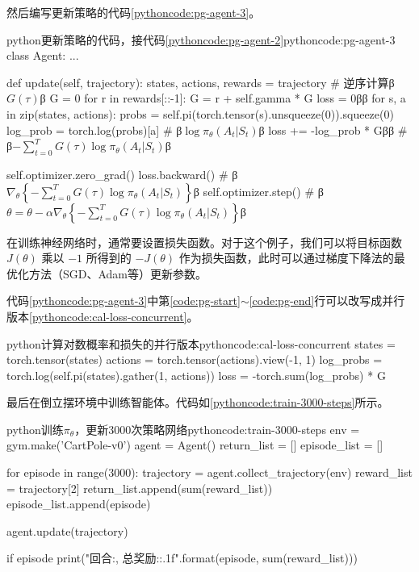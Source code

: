 \documentclass[lang=cn,newtx,10pt,scheme=chinese]{elegantbook}
\begin{document}
然后编写更新策略的代码\ref{pythoncode:pg-agent-3}。

\begin{codebox}{python}{更新策略的代码，接代码\ref{pythoncode:pg-agent-2}}{pythoncode:pg-agent-3}
class Agent:
    ...

    def update(self, trajectory):
        states, actions, rewards = trajectory
        # 逆序计算β$G(\tau)$β
        G = 0
        for r in rewards[::-1]:
            G = r + self.gamma * G
        loss = 0β$\label{code:pg-start}$β
        for s, a in zip(states, actions):
            probs = self.pi(torch.tensor(s).unsqueeze(0)).squeeze(0)
            log_prob = torch.log(probs)[a] # β$\log\pi_\theta(A_t|S_t)$β
            loss += -log_prob * Gβ$\label{code:pg-end}$β # β$-\sum_{t=0}^{T}G(\tau)\log\pi_\theta(A_t|S_t)$β

        self.optimizer.zero_grad()
        loss.backward() # β$\nabla_\theta\left\{ -\sum_{t=0}^{T}G(\tau)\log\pi_\theta(A_t|S_t) \right\}$β
        self.optimizer.step() # β$\theta=\theta-\alpha\nabla_\theta\left\{ -\sum_{t=0}^{T}G(\tau)\log\pi_\theta(A_t|S_t) \right\}$β
\end{codebox}

在训练神经网络时，通常要设置损失函数。对于这个例子，我们可以将目标函数 $J(\theta)$ 乘以 $-1$ 所得到的 $-J(\theta)$ 作为损失函数，此时可以通过梯度下降法的最优化方法（SGD、Adam等）更新参数。

代码\ref{pythoncode:pg-agent-3}中第\ref{code:pg-start}$\sim$\ref{code:pg-end}行可以改写成并行版本\ref{pythoncode:cal-loss-concurrent}。

\begin{marker}
\begin{codebox}{python}{计算对数概率和损失的并行版本}{pythoncode:cal-loss-concurrent}
states = torch.tensor(states)
actions = torch.tensor(actions).view(-1, 1)
log_probs = torch.log(self.pi(states).gather(1, actions))
loss = -torch.sum(log_probs) * G
\end{codebox}
\end{marker}

最后在倒立摆环境中训练智能体。代码如\ref{pythoncode:train-3000-steps}所示。

\begin{codebox}{python}{训练$\pi_\theta$，更新3000次策略网络}{pythoncode:train-3000-steps}
env = gym.make('CartPole-v0')
agent = Agent()
return_list = []
episode_list = []

for episode in range(3000):
    trajectory = agent.collect_trajectory(env)
    reward_list = trajectory[2]
    return_list.append(sum(reward_list))
    episode_list.append(episode)

    agent.update(trajectory)

    if episode %
        print("回合:{}, 总奖励:{:.1f}".format(episode, sum(reward_list)))
\end{codebox}
\end{document}
